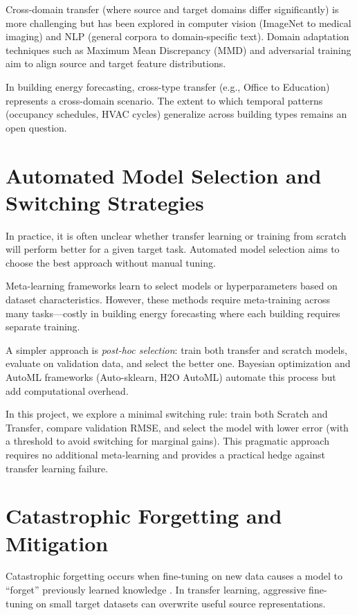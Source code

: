 \documentclass[12pt,a4paper]{report}
\begin{document}
Cross-domain transfer (where source and target domains differ significantly) is more challenging but has been explored in computer vision (ImageNet to medical imaging) and NLP (general corpora to domain-specific text). Domain adaptation techniques such as Maximum Mean Discrepancy (MMD) \cite{tzeng2014deep} and adversarial training \cite{ganin2016domain} aim to align source and target feature distributions.

In building energy forecasting, cross-type transfer (e.g., Office to Education) represents a cross-domain scenario. The extent to which temporal patterns (occupancy schedules, HVAC cycles) generalize across building types remains an open question.

\section{Automated Model Selection and Switching Strategies}

In practice, it is often unclear whether transfer learning or training from scratch will perform better for a given target task. Automated model selection aims to choose the best approach without manual tuning.

Meta-learning frameworks \cite{hospedales2021meta} learn to select models or hyperparameters based on dataset characteristics. However, these methods require meta-training across many tasks—costly in building energy forecasting where each building requires separate training.

A simpler approach is \textit{post-hoc selection}: train both transfer and scratch models, evaluate on validation data, and select the better one. Bayesian optimization and AutoML frameworks (Auto-sklearn, H2O AutoML) automate this process but add computational overhead.

In this project, we explore a minimal switching rule: train both Scratch and Transfer, compare validation RMSE, and select the model with lower error (with a threshold to avoid switching for marginal gains). This pragmatic approach requires no additional meta-learning and provides a practical hedge against transfer learning failure.

\section{Catastrophic Forgetting and Mitigation}

Catastrophic forgetting occurs when fine-tuning on new data causes a model to ``forget'' previously learned knowledge \cite{french1999catastrophic}. In transfer learning, aggressive fine-tuning on small target datasets can overwrite useful source representations.
\end{document}

